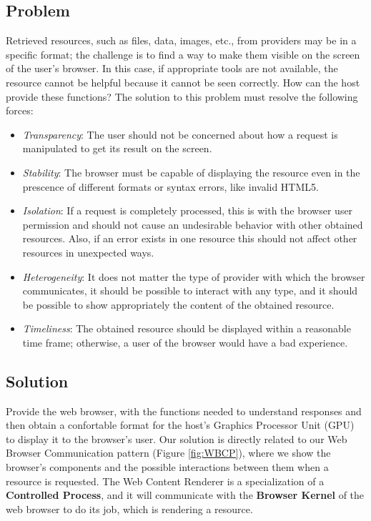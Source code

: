 \documentclass[]{acmlarge}
\begin{document}
  \subsection*{Problem}
  Retrieved resources, such as files, data, images, etc., from providers may be in a specific format; the challenge is to find a way to make them visible on the screen of the user's browser. In this case, if appropriate tools are not available, the resource cannot be helpful because it cannot be seen correctly. How can the host provide these functions? The solution to this problem must resolve the following forces:
  \begin{itemize}\leftskip0.8em
    \item \textit{Transparency}: The user should not be concerned about how a request is manipulated to get its result on the screen.
    \item \textit{Stability}: The browser must be capable of displaying the resource even in the prescence of different formats or syntax errors, like invalid HTML5.
    \item \textit{Isolation}: If a request is completely processed, this is with the browser user permission and should not cause an undesirable behavior with other obtained resources. Also, if an error exists in one resource this should not affect other resources in unexpected ways.
    \item \textit{Heterogeneity}: It does not matter the type of provider with which the browser communicates, it should be possible to interact with any type, and it should be possible to show appropriately the content of the obtained resource.
    \item \textit{Timeliness}: The obtained resource should be displayed within a reasonable time frame; otherwise, a user of the browser would have a bad experience.
  \end{itemize}

  \subsection*{Solution}
  Provide the web browser, with the functions needed to understand responses and then obtain a confortable format for the host's Graphics Processor Unit (GPU) to display it to the browser's user. Our solution is directly related to our Web Browser Communication pattern \cite{silva2015} (Figure \ref{fig:WBCP}), where we show the browser's components and the possible interactions between them when a resource is requested. The Web Content Renderer is a specialization of a \textbf{Controlled Process}, and it will communicate with the \textbf{Browser Kernel} of the web browser to do its job, which is rendering a resource.
\end{document}
